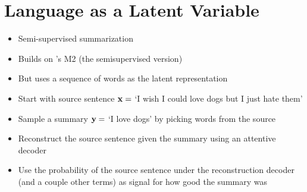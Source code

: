 \section{Language as a Latent Variable}

\begin{frame}
  \begin{center}
   \end{center}   
   
\begin{itemize}
\item Semi-supervised summarization
\item Builds on \cite{kingma2014}'s M2 (the semisupervised version)
\item But uses a sequence of words as the latent representation
\end{itemize}
\end{frame}

\begin{frame}
\begin{center}
\end{center}
\begin{itemize}
\item Start with source sentence $\mathbf{x} =$ `I wish I could love dogs but I just hate them'
\item Sample a summary $\mathbf{y} =$ `I love dogs' by picking words from the source
\item Reconstruct the source sentence given the summary using an attentive decoder
\item Use the probability of the source sentence under the reconstruction decoder
(and a couple other terms) as signal for how good the summary was
\end{itemize}
\end{frame}

